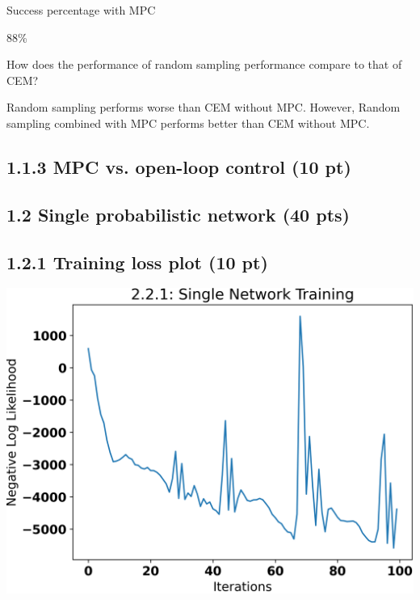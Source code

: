 \documentclass[12pt]{article}
\begin{document}
Success percentage with MPC 
\begin{tcolorbox}[fit,height=1cm, width=5cm, blank, borderline={1pt}{1pt},nobeforeafter]
\begin{center}
    88\%
\end{center}
\end{tcolorbox}

How does the performance of random sampling performance compare to that of CEM?
\begin{tcolorbox}[fit,height=20em, width=40em, blank, borderline={1pt}{1pt},nobeforeafter]
    Random sampling performs worse than CEM without MPC. However, Random sampling combined with MPC performs better than CEM without MPC.
\end{tcolorbox}

\subsection*{1.1.3 MPC vs. open-loop control (10 pt)}

\begin{tcolorbox}[fit,height=20em, width=40em, blank, borderline={1pt}{1pt},nobeforeafter]
\begin{center}
\end{center}
\end{tcolorbox}


\subsection*{1.2 Single probabilistic network (40 pts)}

\subsection*{1.2.1 Training loss plot (10 pt)}

\begin{tcolorbox}[fit,height=30em, width=40em, blank, borderline={1pt}{1pt},nobeforeafter]
\begin{center}
    \includegraphics[width=40em]{2.2.1-loss}
\end{center}
\end{tcolorbox}
\end{document}
